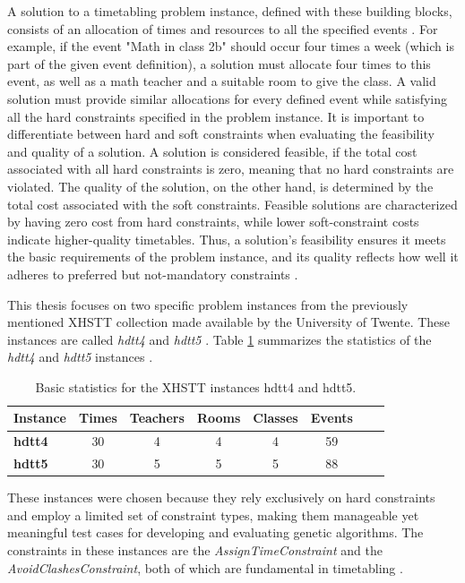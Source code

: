 \documentclass[english,examples]{isasthesis}
\begin{document}
A solution to a timetabling problem instance, defined with these building
blocks, consists of an allocation of times and resources to all the
specified events \cite{xhsttTwenteWeb}.
For example, if the event "Math in class 2b" should occur
four times a week (which is part of the given event definition), a
solution must allocate four times to this event, as well as a math teacher
and a suitable room to give the class. A valid solution must provide similar
allocations for every defined event while satisfying all the hard constraints
specified in the problem instance. It is important to differentiate between
hard and soft constraints when evaluating the feasibility and quality of a
solution. A solution is considered feasible, if the total cost associated with
all hard constraints is zero, meaning that no hard constraints are violated.
The quality of the solution, on the other hand, is determined by the total
cost associated with the soft constraints. Feasible solutions are characterized
by having zero cost from hard constraints, while lower soft-constraint
costs indicate higher-quality timetables. Thus, a solution's feasibility
ensures it meets the basic requirements of the problem instance, and its
quality reflects how well it adheres to preferred but not-mandatory constraints
\cite{Post2014}.

This thesis focuses on two specific problem instances from the previously
mentioned XHSTT collection made available by the University of Twente. These
instances are called \textit{hdtt4} and \textit{hdtt5} \cite{hdtt4,hdtt5}.
Table \ref{tab:instance_stats} summarizes the statistics of the \textit{hdtt4}
and \textit{hdtt5} instances \cite{xhsttTwenteWeb}.
\begin{table}[h!]
    \centering
    \begin{tabular}{lccccccc}
        \toprule
        \textbf{Instance} & \textbf{Times} & \textbf{Teachers} & \textbf{Rooms} & \textbf{Classes} & \textbf{Events} \\ %
        \midrule
        \textbf{hdtt4}    & 30            & 4                 & 4              & 4                & 59             \\ %
        \textbf{hdtt5}    & 30            & 5                 & 5              & 5                & 88             \\ %
        \bottomrule
    \end{tabular}

    \caption{Basic statistics for the XHSTT instances hdtt4 and hdtt5.}
    \label{tab:instance_stats}
\end{table}
These instances were chosen because they rely exclusively on hard constraints
and employ a limited set of constraint types, making them manageable yet 
meaningful test cases for developing and evaluating genetic algorithms. The
constraints in these instances are the \textit{AssignTimeConstraint} and the
\textit{AvoidClashesConstraint}, both of which are fundamental in
timetabling \cite{xhsttDocs}.
\end{document}
